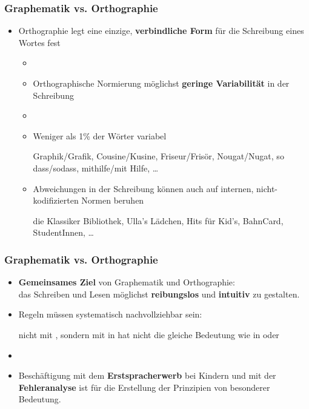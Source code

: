 \begin{frame}
\frametitle{Graphematik vs. Orthographie}

\begin{itemize}
	\item Orthographie legt \idR eine einzige, \textbf{verbindliche Form} für die Schreibung eines Wortes fest
	
	\begin{itemize}
		\item[]		
		\item Orthographische Normierung \ras möglichst \textbf{geringe Variabilität} in der Schreibung
		\item[]
		\item Weniger als 1\% der Wörter variabel
			
		  \ea
                  Graphik/Grafik, Cousine/Kusine, Friseur/Frisör, Nougat/Nugat, so dass/sodass,
                  mithilfe/mit Hilfe, \dots
                  \z
			
		\item Abweichungen in der Schreibung können auch auf internen, nicht-kodifizierten Normen beruhen
			
		  \ea
                  die Klassiker Bibliothek, Ulla's Lädchen, Hits für Kid's, BahnCard, StudentInnen,
                  \dots
                  \z
			
		
	\end{itemize}
\end{itemize}


\end{frame}



\begin{frame}
\frametitle{Graphematik vs. Orthographie}

\begin{itemize}
	\item \textbf{Gemeinsames Ziel} von Graphematik und Orthographie:\\
	 das Schreiben und Lesen möglichst \textbf{reibungslos} und \textbf{intuitiv} zu gestalten.
	\item Regeln müssen systematisch nachvollziehbar sein:
	
	  \ea
           nicht mit , sondern mit  \ras {} in  hat nicht
          die gleiche Bedeutung wie  in  oder 
          \z
	
	\item[]
	\item Beschäftigung mit dem \textbf{Erstspracherwerb} bei Kindern und mit der \textbf{Fehleranalyse} ist für die Erstellung der Prinzipien von besonderer Bedeutung.
\end{itemize}


\end{frame}


